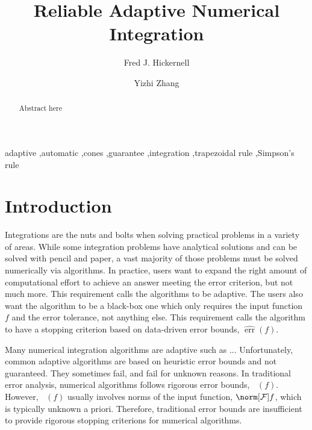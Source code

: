\documentclass[]{elsarticle}
\DeclareMathOperator{\err}{err}
\newcommand{\herr}{\widehat{\err}}
\theoremstyle{definition}
\theoremstyle{remark}
\DeclareMathOperator{\oerr}{\overline{\err}}
\newcommand{\calf}{{\mathcal{F}}}
\begin{document}
\begin{frontmatter}

\title{Reliable Adaptive Numerical Integration}
\author{Fred J. Hickernell} 
\author{Yizhi Zhang} 
\address{IIT Tower 7th Floor, Illinois Institute of Technology,\\ 10 W.\ 35$^{\text{nd}}$ St., Chicago, IL 60616}
\begin{abstract}
Abstract here
\end{abstract}

\begin{keyword}
adaptive \sep automatic \sep cones \sep  guarantee \sep integration \sep trapezoidal rule \sep Simpson's rule


\end{keyword}
\end{frontmatter}

\section{Introduction}

Integrations are the nuts and bolts when solving practical problems in a variety of areas. While some integration problems have analytical solutions and can be solved with pencil and paper, a vast majority of those problems must be solved numerically via algorithms. In practice, users want to expand the right amount of computational effort to achieve an answer meeting the error criterion, but not much more. This requirement calls the algorithms to be adaptive. The users also want the algorithm to be a black-box one which only requires the input function $f$ and the error tolerance, not anything else. This requirement calls the algorithm to have a stopping criterion based on data-driven error bounds, $\herr(f)$.

Many numerical integration algorithms are adaptive such as ... Unfortunately, common adaptive algorithms are based on heuristic error bounds and not guaranteed. They sometimes fail, and fail for unknown reasons. In traditional error analysis, numerical algorithms follows rigorous error bounds, $\oerr(f)$. However, $\oerr(f)$ usually involves norms of the input function, $\norm[\calf]{f}$, which is typically unknown a priori. Therefore, traditional error bounds are insufficient to provide rigorous stopping criterions for numerical algorithms.
\end{document}
